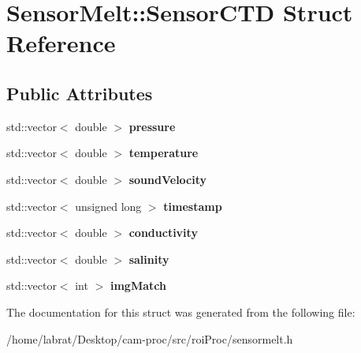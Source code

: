 \hypertarget{structSensorMelt_1_1SensorCTD}{}\section{Sensor\+Melt\+:\+:Sensor\+C\+TD Struct Reference}
\label{structSensorMelt_1_1SensorCTD}
\subsection*{Public Attributes}
\begin{DoxyCompactItemize}
\item 
std\+::vector$<$ double $>$ {\bfseries pressure}\hypertarget{structSensorMelt_1_1SensorCTD_ab0367fedb3fdf6f6fe217be0af041aa8}{}\label{structSensorMelt_1_1SensorCTD_ab0367fedb3fdf6f6fe217be0af041aa8}

\item 
std\+::vector$<$ double $>$ {\bfseries temperature}\hypertarget{structSensorMelt_1_1SensorCTD_a0065a17aced07f0dfdee89effb8f604f}{}\label{structSensorMelt_1_1SensorCTD_a0065a17aced07f0dfdee89effb8f604f}

\item 
std\+::vector$<$ double $>$ {\bfseries sound\+Velocity}\hypertarget{structSensorMelt_1_1SensorCTD_ac7838334c3b8c2643153889713f7e04a}{}\label{structSensorMelt_1_1SensorCTD_ac7838334c3b8c2643153889713f7e04a}

\item 
std\+::vector$<$ unsigned long $>$ {\bfseries timestamp}\hypertarget{structSensorMelt_1_1SensorCTD_a7ce95b30301842adb088595cf21dbb06}{}\label{structSensorMelt_1_1SensorCTD_a7ce95b30301842adb088595cf21dbb06}

\item 
std\+::vector$<$ double $>$ {\bfseries conductivity}\hypertarget{structSensorMelt_1_1SensorCTD_abca4d364ec748b24aaf1c1903edb2808}{}\label{structSensorMelt_1_1SensorCTD_abca4d364ec748b24aaf1c1903edb2808}

\item 
std\+::vector$<$ double $>$ {\bfseries salinity}\hypertarget{structSensorMelt_1_1SensorCTD_af5da52ac910860ac62328fb1e581f112}{}\label{structSensorMelt_1_1SensorCTD_af5da52ac910860ac62328fb1e581f112}

\item 
std\+::vector$<$ int $>$ {\bfseries img\+Match}\hypertarget{structSensorMelt_1_1SensorCTD_afe0e6cd67b8973b886ba25b41317309d}{}\label{structSensorMelt_1_1SensorCTD_afe0e6cd67b8973b886ba25b41317309d}

\end{DoxyCompactItemize}


The documentation for this struct was generated from the following file\+:\begin{DoxyCompactItemize}
\item 
/home/labrat/\+Desktop/cam-\/proc/src/roi\+Proc/sensormelt.\+h\end{DoxyCompactItemize}
